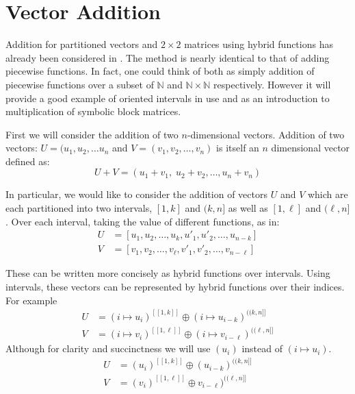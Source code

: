 %
%

\section{Vector Addition}
Addition for partitioned vectors and $2 \times 2$ matrices using hybrid functions has already been considered in \cite{sexton2008abstract, carette2010}.
The method is nearly identical to that of adding piecewise functions.
In fact, one could think of both as simply addition of piecewise functions over a subset of 
$\mathbb{N}$ and $\mathbb{N} \times \mathbb{N}$ respectively.
However it will provide a good example of oriented intervals in use and as an introduction to multiplication of 
symbolic block matrices.


First we will consider the addition of two $n$-dimensional vectors.
Addition of two vectors: $U= (u_1, u_2, \ldots u_n$ and $V = (v_1, v_2, \ldots, v_n)$ is itself an $n$ dimensional vector 
defined as:
\begin{equation}
	U+V = (u_1+v_1, \; u_2+v_2, \ldots, u_n+v_n)
\end{equation}


In particular, we would like to consider the addition of vectors $U$ and $V$ which are each partitioned into two intervals,
$[1,k]$ and $(k,n]$ as well as $[1,\ell]$ and $(\ell, n]$.
Over each interval, taking the value of different functions, as in:
\begin{align}
	U &= [ u_1, u_2, \ldots, u_{k}, u'_1, u'_2, \ldots, u_{n-k} ] \\
	V &= [ v_1, v_2, \ldots, v_{\ell}, v'_1, v'_2, \ldots, v_{n-\ell} ]
\end{align}


These can be written more concisely as hybrid functions over intervals. 
Using intervals, these vectors can be represented by hybrid functions over their indices.
For example
\begin{align}
	U &= (i \mapsto u_i)^{[\![1, k]\!]} \oplus (i \mapsto u_{i-k})^{(\!(k,n]\!]} \\
	V &= (i \mapsto v_i)^{[\![1, \ell]\!]} \oplus (i \mapsto v_{i-\ell})^{(\!(\ell,n]\!]}
\end{align}
Although for clarity and succinctness we will use $(u_i)$ instead of $(i \mapsto u_i)$.
\begin{align}
	U &= (u_i)^{[\![1, k]\!]} \oplus (u_{i-k})^{(\!(k,n]\!]} \\
	V &= (v_i)^{[\![1, \ell]\!]} \oplus v_{i-\ell})^{(\!(\ell,n]\!]}
\end{align}


